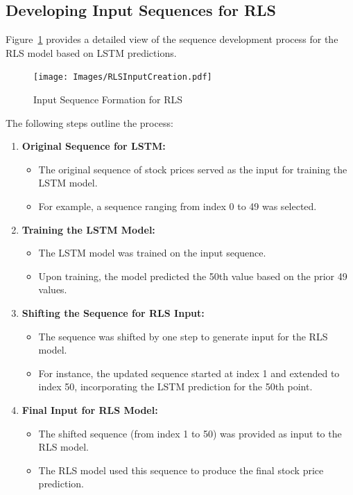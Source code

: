 \subsection{Developing Input Sequences for RLS}

Figure~\ref{fig:inputseq} provides a detailed view of the sequence development process for the RLS model based on LSTM predictions.

\begin{figure}[htbp]
    \centering
    \texttt{[image: Images/RLSInputCreation.pdf]} %
    \caption{Input Sequence Formation for RLS}
    \label{fig:inputseq}
\end{figure}

The following steps outline the process:

\begin{enumerate}
    \item \textbf{Original Sequence for LSTM:}
    \begin{itemize}
        \item The original sequence of stock prices served as the input for training the LSTM model.
        \item For example, a sequence ranging from index 0 to 49 was selected.
    \end{itemize}
    
    \item \textbf{Training the LSTM Model:}
    \begin{itemize}
        \item The LSTM model was trained on the input sequence.
        \item Upon training, the model predicted the 50th value based on the prior 49 values.
    \end{itemize}
    
    \item \textbf{Shifting the Sequence for RLS Input:}
    \begin{itemize}
        \item The sequence was shifted by one step to generate input for the RLS model.
        \item For instance, the updated sequence started at index 1 and extended to index 50, incorporating the LSTM prediction for the 50th point.
    \end{itemize}
    
    \item \textbf{Final Input for RLS Model:}
    \begin{itemize}
        \item The shifted sequence (from index 1 to 50) was provided as input to the RLS model.
        \item The RLS model used this sequence to produce the final stock price prediction.
    \end{itemize}
\end{enumerate}

